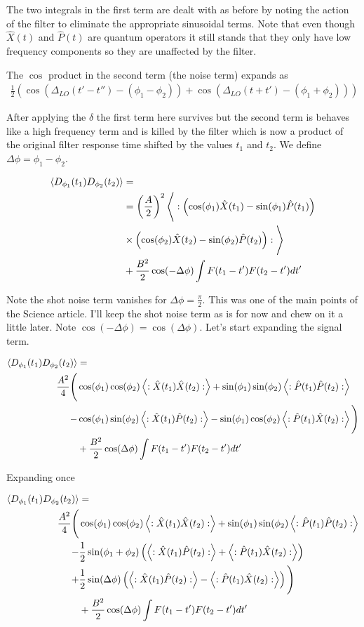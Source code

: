 \documentclass[12pt]{article}
\begin{document}
The two integrals in the first term are dealt with as before by noting the action of the filter to eliminate the appropriate sinusoidal terms. Note that even though $\hat{X}(t)$ and $\hat{P}(t)$ are quantum operators it still stands that they only have low frequency components so they are unaffected by the filter. 

The $\cos$ product in the second term (the noise term) expands as 
\begin{align}
\frac{1}{2}\left(\cos(\Delta_{LO}(t'-t'') - (\phi_1-\phi_2)) + \cos(\Delta_{LO}(t+t') - (\phi_1 + \phi_2)) \right)
\end{align}

After applying the $\delta$ the first term here survives but the second term is behaves like a high frequency term and is killed by the filter which is now a product of the original filter response time shifted by the values $t_1$ and $t_2$. We define $\Delta \phi = \phi_1-\phi_2$.

\begin{align}
\Braket{D_{\phi_1}(t_1)D_{\phi_2}(t_2)} &=\\
&=\left(\frac{A}{2}\right)^2\Bigg<:\left(\cos(\phi_1)\hat{X}(t_1) - \sin(\phi_1)\hat{P}(t_1)\right)\\
&\times\left(\cos(\phi_2)\hat{X}(t_2) - \sin(\phi_2)\hat{P}(t_2)\right):\Bigg>\\
&+\frac{B^2}{2}\cos(-\Delta \phi)\int F(t_1-t')F(t_2-t')dt'
\end{align}

Note the shot noise term vanishes for $\Delta \phi = \frac{\pi}{2}$. This was one of the main points of the Science article. I'll keep the shot noise term as is for now and chew on it a little later. Note $\cos(-\Delta \phi) = \cos(\Delta \phi)$. Let's start expanding the signal term.

\begin{align}
\Braket{D_{\phi_1}(t_1)D_{\phi_2}(t_2)} &=\\
\frac{A^2}{4}\Bigg(&\cos(\phi_1)\cos(\phi_2)\Braket{:\hat{X}(t_1)\hat{X}(t_2):} + \sin(\phi_1)\sin(\phi_2)\Braket{:\hat{P}(t_1)\hat{P}(t_2):}\\
-&\cos(\phi_1)\sin(\phi_2)\Braket{:\hat{X}(t_1)\hat{P}(t_2):}-\sin(\phi_1)\cos(\phi_2)\Braket{:\hat{P}(t_1)\hat{X}(t_2):}\Bigg)\\
&+\frac{B^2}{2}\cos(\Delta \phi)\int F(t_1-t')F(t_2-t')dt'
\end{align}

Expanding once

\begin{align}
\Braket{D_{\phi_1}(t_1)D_{\phi_2}(t_2)} &=\\
\frac{A^2}{4}\Bigg(&\cos(\phi_1)\cos(\phi_2)\Braket{:\hat{X}(t_1)\hat{X}(t_2):} + \sin(\phi_1)\sin(\phi_2)\Braket{:\hat{P}(t_1)\hat{P}(t_2):}\\
-&\frac{1}{2}\sin(\phi_1+\phi_2)\left(\Braket{:\hat{X}(t_1)\hat{P}(t_2):} + \Braket{:\hat{P}(t_1)\hat{X}(t_2):}\right)\\
+&\frac{1}{2}\sin(\Delta \phi) \left(\Braket{:\hat{X}(t_1)\hat{P}(t_2):} - \Braket{:\hat{P}(t_1)\hat{X}(t_2):}\right)\Bigg)\\
&+\frac{B^2}{2}\cos(\Delta \phi)\int F(t_1-t')F(t_2-t')dt'
\end{align}
\end{document}
